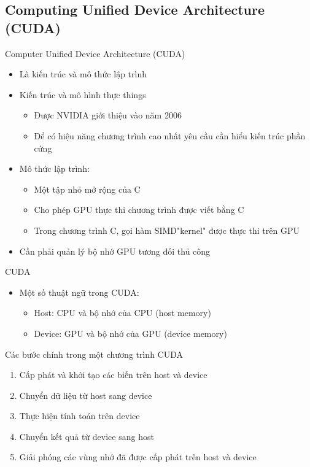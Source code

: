\documentclass[10pt]{beamer}
\theoremstyle{remark}
\numberwithin{algocf}{section}
\numberwithin{equation}{section}
\numberwithin{dl}{section}
\numberwithin{figure}{section}
\begin{document}
\subsection{Computing Unified Device Architecture (CUDA)}

\begin{frame}{Computer Unified Device Architecture (CUDA)}
    \begin{itemize}
        \item Là kiến trúc và mô thức lập trình
        \item Kiến trúc và mô hình thực things
        \begin{itemize}
            \item Được NVIDIA giới thiệu vào năm 2006
            \item Để có hiệu năng chương trình cao nhất yêu cầu cần hiểu kiến trúc phần cứng
        \end{itemize}
        \item Mô thức lập trình:
        \begin{itemize}
            \item Một tập nhỏ mở rộng của C
            \item Cho phép GPU thực thi chương trình được viết bằng C
            \item Trong chương trình C, gọi hàm SIMD"kernel" được thực thi trên GPU
        \end{itemize}
        \item Cần phải quản lý bộ nhớ GPU tương đối thủ công
    \end{itemize}
\end{frame}

\begin{frame}{CUDA}
    \begin{itemize}
        \item Một số thuật ngữ trong CUDA:
        \begin{itemize}
            \item Host: CPU và bộ nhớ của CPU (host memory)
            \item Device: GPU và bộ nhớ của GPU (device memory)
        \end{itemize}
    \end{itemize}
\end{frame}

\begin{frame}{Các bước chính trong một chương trình CUDA}
    \begin{enumerate}
        \item Cấp phát và khởi tạo các biến trên host và device
        \item Chuyển dữ liệu từ host sang device
        \item Thực hiện tính toán trên device
        \item Chuyển kết quả từ device sang host
        \item Giải phóng các vùng nhớ đã được cấp phát trên host và device
    \end{enumerate}
\end{frame}
\end{document}
